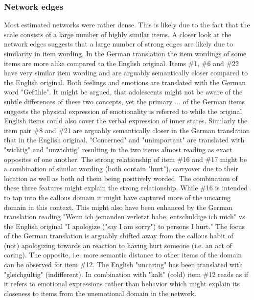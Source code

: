 \subsubsection{Network edges}
Most estimated networks were rather dense.
This is likely due to the fact that the scale consists of a large number of highly similar items.
A closer look at the network edges suggests that a large number of strong edges are likely due to similarity in item wording. 
In the German translation the item wordings of some items are more alike compared to the English original.
Items \#1, \#6 and \#22 have very similar item wording and are arguably semantically closer compared to the English original.
Both feelings and emotions are translated with the German word "Gefühle". 
It might be argued, that adolescents might not be aware of the subtle differences of these two concepts, yet the primary 
... of the German items suggests the physical expression of emotionality is referred to while the original English items could also cover the verbal expression of inner states.
Similarly the item pair \#8 and \#21 are arguably semantically closer in the German translation that in the English original. 
"Concerned" and "unimportant" are translated with "wichtig" and "unwichtig" resulting in the two items almost reading as exact opposites of one another.
The strong relationship of item \#16 and \#17 might be a combination of similar wording (both contain "hurt"), carryover due to their location as well as both od them being positively worded.
The combination of these three features might explain the strong relationship. While \#16 is intended to tap into the callous domain it might have captured more of the uncaring domain in this context.
This might also have been enhanced by the German translation reading "Wenn ich jemanden verletzt habe, entschuldige ich mich" vs the English original "I apologize ("say I am sorry") to persons I hurt."
The focus of the German translation is arguably shifted away from the callous habit of (not) apologizing towards an reaction to having hurt someone (i.e. an act of caring).
The opposite, i.e. more semantic distance to other items of the domain can be observed for item \#12. The English "uncaring" has been translated with "gleichgültig" (indifferent). 
In combination with "kalt" (cold) item \#12 reads as if it refers to emotional expressions rather than behavior which might explain its closeness to items from the unemotional domain in the network.

